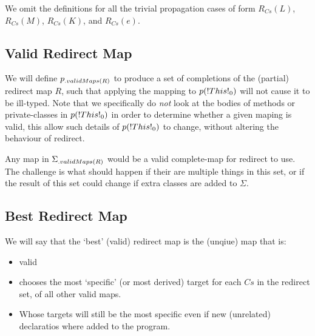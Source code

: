 \begin{defs}
\end{defs}

We omit the definitions for all the trivial propagation cases of form $R_{Cs}(L)$, $R_{Cs}(M)$, $R_{Cs}(K)$, and $R_{Cs}(e)$.

\subsection{Valid Redirect Map}


We will define $p{{}_{.{validMaps}({R})}}$ to produce a set of completions of the (partial) redirect map $R$, such that applying the mapping to $p(\ThisN{0})$ will not cause it to be ill-typed. Note that we specifically do \emph{not} look at the bodies of methods or private-classes in $p(\ThisN{0})$ in order to determine whether a given maping is valid, this allow such details of $p(\ThisN{0})$ to change, without altering the behaviour of redirect.

\begin{defs}
{}
\end{defs}

Any map in $\Sigma{\ensuremath{{}_{.{validMaps}({R})}}}$ would be a valid complete-map for redirect to use. The challenge is what should happen if their are multiple things in this set, or if the result of this set could change if extra classes are added to $\Sigma$.

\subsection {Best Redirect Map}
We will say that the `best' (valid) redirect map is the (unqiue) map that is:
\begin{itemize}
	\item valid
	\item chooses the most `specific' (or most derived) target for each $Cs$ in the redirect set, of all other valid maps.
	\item Whose targets will still be the most specific even if new (unrelated) declaratios where added to the program.
\end{itemize}

